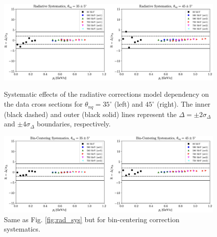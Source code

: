 \documentclass[aps, prl]{revtex4-2}  %
\begin{document}
\begin{figure}[!h]
\includegraphics[scale=0.31]{plots/rad_sys.png}
\caption{Systematic effects of the radiative corrections model dependency on the data cross sections for $\theta_{nq}=35^{\circ}$ (left) and $45^{\circ}$ (right). The inner (black dashed) and outer (black solid) lines represent the $\Delta=\pm2\sigma_{\Delta}$ and $\pm4\sigma_{\Delta}$ boundaries, respectively.  }
\label{fig:rad_sys}
\includegraphics[scale=0.31]{plots/bc_sys.png}
\caption{Same as Fig. \ref{fig:rad_sys} but for bin-centering correction systematics.}
\label{fig:bc_sys}
\end{figure}



\end{document}
